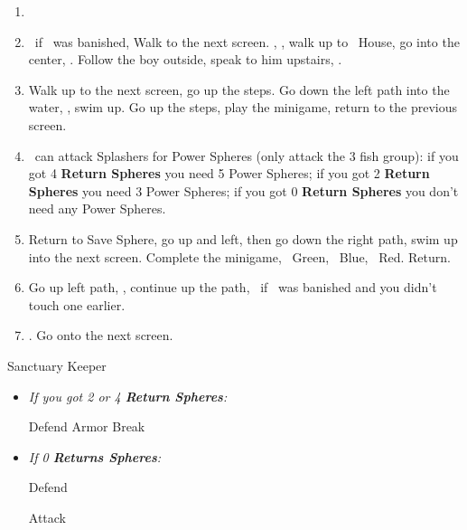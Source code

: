 \begin{enumerate}[resume]
	\item \formation{\tidus}{\kimahri}{\auron}
	\item \save\ if \bahamut\ was banished, Walk to the next screen. \skippablefmv[0:20], \sd, walk up to \tidus\ House, go into the center, \sd. Follow the boy outside, speak to him upstairs, \sd.
	\item Walk up to the next screen, go up the steps. Go down the left path into the water, \sd, swim up. Go up the steps, play the minigame, return to the previous screen.
	\item \tidus\ can attack Splashers for Power Spheres (only attack the 3 fish group): if you got 4 \textbf{Return Spheres} you need 5 Power Spheres; if you got 2 \textbf{Return Spheres} you need 3 Power Spheres; if you got 0 \textbf{Return Spheres} you don't need any Power Spheres.
	\item Return to Save Sphere, go up and left, then go down the right path, swim up into the next screen. Complete the minigame, \rikku\ Green, \tidus\ Blue, \wakka\ Red. Return.
	\item Go up left path, \sd, continue up the path, \save\ if \bahamut\ was banished and you didn't touch one earlier.
	\item \formation{\tidus}{\yuna}{\wakka}. Go onto the next screen.
\end{enumerate}
\bothvfill
\winvfill
\lossvfill
\begin{battle}[40000]{Sanctuary Keeper}
	\begin{itemize}
		\item \textit{If you got 2 or 4 \textbf{Return Spheres}:}
			\begin{itemize}
				\yunaf Defend
				\tidusf Armor Break
			\end{itemize}
		\item \textit{If 0 \textbf{Returns Spheres}:}
			\begin{itemize}
				\tidusf Defend
			\end{itemize}
		\summon{\bahamut}
		\bahamutf Attack
	\end{itemize}
\end{battle}
